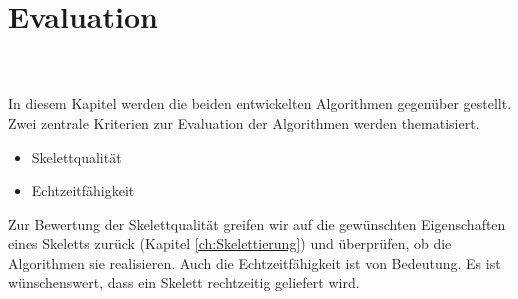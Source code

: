\chapter{Evaluation}
\\\\
In diesem Kapitel werden die beiden entwickelten Algorithmen gegenüber gestellt. Zwei zentrale Kriterien zur Evaluation der Algorithmen werden thematisiert.
\begin{itemize}
\item Skelettqualität
\item Echtzeitfähigkeit
\end{itemize}
Zur Bewertung der Skelettqualität greifen wir auf die
gewünschten Eigenschaften eines Skeletts zurück (Kapitel \ref{ch:Skelettierung}) und überprüfen, ob die Algorithmen sie realisieren. Auch die Echtzeitfähigkeit ist von Bedeutung. 
Es ist wünschenswert, dass ein Skelett rechtzeitig geliefert wird.
